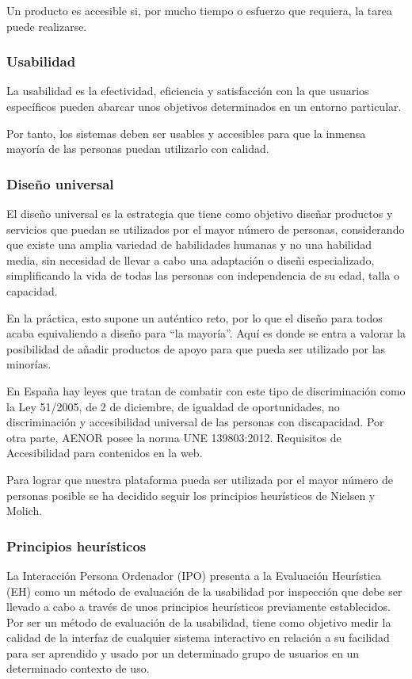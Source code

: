 Un producto es accesible si, por mucho tiempo o esfuerzo que requiera, la tarea puede realizarse.


\subsubsection{Usabilidad}
La usabilidad es la efectividad, eficiencia y satisfacción con la que usuarios específicos pueden abarcar unos objetivos determinados en un entorno particular\cite{iso_ergonomics}.


Por tanto, los sistemas deben ser usables y accesibles para que la inmensa mayoría de las personas puedan utilizarlo con calidad.


\subsubsection{Diseño universal}
El diseño universal es la estrategia que tiene como objetivo diseñar productos y servicios que puedan se utilizados por el mayor número de personas, considerando que existe una amplia variedad de habilidades humanas y no una habilidad media, sin necesidad de llevar a cabo una adaptación o diseñi especializado, simplificando la vida de todas las personas con independencia de su edad, talla o capacidad\cite{ekberg}.


En la práctica, esto supone un auténtico reto, por lo que el diseño para todos acaba equivaliendo a diseño para “la mayoría”. Aquí es donde se entra a valorar la posibilidad de añadir productos de apoyo para que pueda ser utilizado por las minorías.


En España hay leyes que tratan de combatir con este tipo de discriminación como la Ley 51/2005, de 2 de diciembre, de igualdad de oportunidades, no discriminación y accesibilidad universal de las personas con discapacidad. Por otra parte, AENOR posee la norma UNE 139803:2012. Requisitos de Accesibilidad para contenidos en la web\cite{aenor_req_acces}.


Para lograr que nuestra plataforma pueda ser utilizada por el mayor número de personas posible se ha decidido seguir los principios heurísticos de Nielsen y Molich.


\subsubsection{Principios heurísticos}
La Interacción Persona Ordenador (IPO) presenta a la Evaluación Heurística (EH) como un método de evaluación de la usabilidad por inspección que debe ser llevado a cabo a través de unos principios heurísticos previamente establecidos. Por ser un método de evaluación de la usabilidad, tiene como objetivo medir la calidad de la interfaz de cualquier sistema interactivo en relación a su facilidad para ser aprendido y usado por un determinado grupo de usuarios en un determinado contexto de uso.


